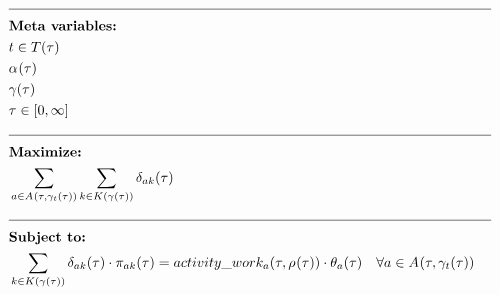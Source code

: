\begin{alignat}{2}
	& \text{\rule{\linewidth}{0.4pt}} \notag\\
	& \textbf{Meta variables:}                                                                                                                                                                         \notag\\
	& \ElementTechnician \in \SetTechnician                                                                                                                                                            \\
	& \VarStrategicWorkOrderAssignment{}{}                                                                                                                                                             \\
	& \VarSupervisorAssignment{}{}                                                                                                                                                                     \\
	& \tau \in [0, \infty]                                                                                                                                                                             \\
	& \text{\rule{\linewidth}{0.4pt}} \notag\\
	& \textbf{Maximize:}                                                                                                                                                                               \notag\\
	& \sum_{\ElementActivity \in \SetActivity{\VarSupervisorAssignment{}{\ElementTechnician}}{}} \sum_{\ElementWorkSegment \in \SetWorkSegment} \VarProcessingTime                                           \\
	& \text{\rule{\linewidth}{0.4pt}} \notag\\
	& \textbf{Subject to:}                                                                                                                                                                             \notag\\
    & \sum_{\ElementWorkSegment \in \SetWorkSegment} \VarProcessingTime \cdot \VarActiveSegment{\ElementActivity}{\ElementWorkSegment} = \ParActivityWork{} \cdot \VarIncludeActivity{\ElementActivity}                                                                                                                                            \quad \forall \ElementActivity \in \SetActivity{\VarSupervisorAssignment{}{\ElementTechnician}}{}                                                                                                      \\

\end{alignat}
